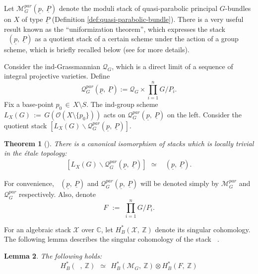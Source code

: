 \documentclass[10pt,reqno]{amsart}
\DeclareMathOperator{\mgpar}{\mc{M}_G^{par}}
\newcommand{\mc}[1]{\mathcal{#1}}
\newcommand{\bb}[1]{\mathbb{#1}}
\newtheorem{theorem}{Theorem}[section]
\newtheorem{lemma}[theorem]{Lemma}
\theoremstyle{myroman}
\numberwithin{equation}{section}
\begin{document}
		Let $\mc{M}_G^{par}\left(\underline{p},\ \underline{P}\right)$ denote the moduli stack of quasi-parabolic 
		principal $G$-bundles on $X$ of type $\underline{P}$ (Definition \ref{def:quasi-parabolic-bundle}). There is a 
		very useful result known as the ``uniformization theorem'', which expresses the stack $\mgpar(\underline{p},\ 
		\underline{P})$ as a quotient stack of a certain scheme under the action of a group scheme, which is
		briefly recalled below (see \cite{LS97} for more details).
		
		Consider the ind-Grassmannian $\mc{Q}_G$, which is a direct limit of a sequence of integral projective varieties. Define
		$$\mc{Q}_G^{par} \left(\underline{p},\ \underline{P}\right):= \mc{Q}_G\times \prod_{i=1}^{n}G/{P_i}.$$
		Fix a base-point $p_0\,\in\, X\setminus S$. The ind-group scheme $L_X(G)
		\,:= \,G(\mc{O}(X\setminus \{p_0\}))$ acts on $\mc{Q}_G^{par}\left(\underline{p},\ \underline{P}\right)$ on the
		left. Consider the quotient stack $\left[L_X(G)\backslash\mc{Q}_G^{par}\left(\underline{p},\ 
		\underline{P}\right)\right]$.
		
		\begin{theorem}[{\cite[Theorem 8.5]{LS97}}]\label{thm:uniformization}
			There is a canonical isomorphism of stacks which is locally trivial in the \'etale topology:
			\begin{align}
				\left[L_X(G)\backslash\mc{Q}_G^{par}\left(\underline{p},\ \underline{P}\right)\right]\,\ \simeq\, \ 
				\mgpar\left(\underline{p},\ \underline{P}\right).
			\end{align}
		\end{theorem}
		
		For convenience, $\mgpar\left(\underline{p},\ \underline{P}\right)$ and $\mc{Q}^{par}_G\left(\underline{p},
		\ \underline{P}\right)$ will be denoted simply by $\mc{M}_G^{par}$ and $\mc{Q}^{par}_G$ respectively.
		Also, denote
		$$F\ \, :=\ \, \prod_{i=1}^{n}G/P_i .$$  
		
		For an algebraic stack $\mathscr{X}$ over $\bb{C}$, let $H_B^*\left(\mathscr{X},\ \bb{Z}\right)$
		denote its singular cohomology. The following lemma describes the singular cohomology of the stack $\mgpar$.
		
		\begin{lemma}\label{lem:singular-cohomology}
			The following holds:
			$$H_B^*\left(\mgpar,\ \bb{Z}\right)\ \ \simeq\ \ H_B^*\left(\mc{M}_G,\ \bb{Z}\right)\otimes
			H_B^*\left(F,\ \bb{Z}\right)
			$$
		\end{lemma}
		
\end{document}
